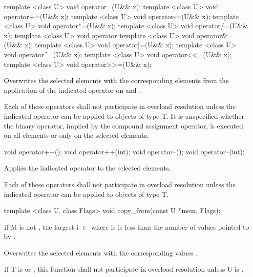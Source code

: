 \begin{itemdecl}
template <class U> void operator=(U&& x);
template <class U> void operator+=(U&& x);
template <class U> void operator-=(U&& x);
template <class U> void operator*=(U&& x);
template <class U> void operator/=(U&& x);
template <class U> void operator%
template <class U> void operator&=(U&& x);
template <class U> void operator|=(U&& x);
template <class U> void operator^=(U&& x);
template <class U> void operator<<=(U&& x);
template <class U> void operator>>=(U&& x);
\end{itemdecl}
\begin{itemdescr}
  \pnum\effects
  Overwrites the selected elements with the corresponding elements from the application of the indicated operator on  and .

  \pnum\remarks Each of these operators shall not participate in overload resolution unless the indicated operator can be applied to objects of type \type T.
  It is unspecified whether the binary operator, implied by the compound assignment operator, is executed on all elements or only on the selected elements.
\end{itemdescr}

\begin{itemdecl}
void operator++();
void operator++(int);
void operator--();
void operator--(int);
\end{itemdecl}
\begin{itemdescr}
  \pnum\effects Applies the indicated operator to the selected elements.

  \pnum\remarks Each of these operators shall not participate in overload resolution unless the indicated operator can be applied to objects of type \type T.
\end{itemdescr}

\begin{itemdecl}
template <class U, class Flags> void copy_from(const U *mem, Flags);
\end{itemdecl}
\begin{itemdescr}
  If \type M is not \bool, the largest i $\in$ \code{[0, M::size())} where  is \true is less than the number of values pointed to by .

  \pnum\effects Overwrites the selected elements with the corresponding values  .

  \pnum\remarks If \type T is \bool or , this function shall not participate in overload resolution unless \type U is \bool.
\end{itemdescr}

